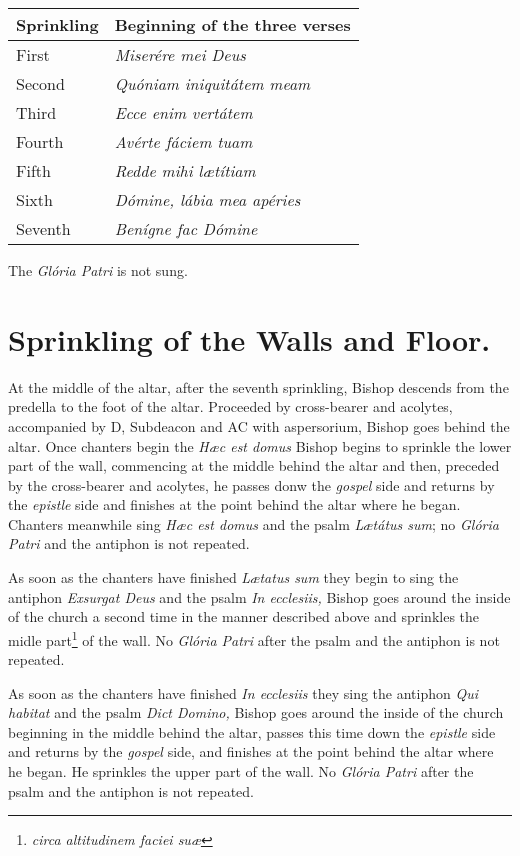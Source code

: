 \documentclass[letterpaper]{report}
\begin{document}
{\begin{tabular}{l l}
    \toprule
    Sprinkling & Beginning of the three verses \\
    \midrule
    First & \textit{Miserére mei Deus} \\
    Second & \textit{Quóniam iniquitátem meam} \\
    Third & \textit{Ecce enim vertátem} \\
    Fourth & \textit{Avérte fáciem tuam} \\
    Fifth & \textit{Redde mihi l\ae títiam} \\
    Sixth & \textit{Dómine, lábia mea apéries} \\
    Seventh & \textit{Benígne fac Dómine} \\
    \bottomrule
\end{tabular}

The \textit{Glória Patri} is not sung.

\section{Sprinkling of the Walls and Floor.}

\rubric At the middle of the altar, after the seventh sprinkling, Bishop descends
from the predella to the foot of the altar. Proceeded by cross-bearer and acolytes,
accompanied by D, Subdeacon and AC with aspersorium, Bishop goes behind the altar. Once
chanters begin the \textit{H\ae c est domus} Bishop begins to sprinkle the lower
part of the wall, commencing at the middle behind the altar and then, preceded
by the cross-bearer and acolytes, he passes donw the \textit{gospel} side and returns by the
\textit{epistle} side and finishes at the point behind the altar where he
began. Chanters meanwhile sing \textit{H\ae c est domus} and the psalm
\textit{L\ae tátus sum}; no \textit{Glória Patri} and the antiphon is not
repeated.

\rubric As soon as the chanters have finished \textit{L\ae tatus sum} they
begin to sing the antiphon \textit{Exsurgat Deus} and the psalm \textit{In
ecclesiis,} Bishop goes around the inside of the church a second time in the manner
described above and sprinkles the midle part\footnote{\textit{circa altitudinem
faciei su\ae}} of the wall. No \textit{Glória Patri} after the psalm and the
antiphon is not repeated.

\rubric As soon as the chanters have finished \textit{In ecclesiis} they sing
the antiphon \textit{Qui habitat} and the psalm \textit{Dict Domino,} Bishop goes
around the inside of the church beginning in the middle behind the altar,
passes this time down the \textit{epistle} side and returns by the
\textit{gospel} side, and finishes at the point behind the altar where he
began. He sprinkles the upper part of the wall. No \textit{Glória Patri} after
the psalm and the antiphon is not repeated.

}
\end{document}
